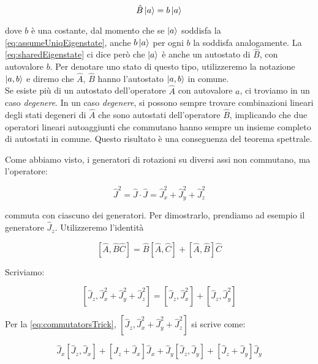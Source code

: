 	\begin{equation} \label{eq:sharedEigenstate}
		\hat{B}\ket{a} = b \ket{a}
	\end{equation}

dove $b$ \`e una costante, dal momento che se $\ket{a}$ soddisfa la \eqref{eq:assumeUniqEigenstate}, anche $b \ket{a}$ per ogni $b$ la soddisfa analogamente. La \eqref{eq:sharedEigenstate} ci dice per\`o che $\ket{a}$ \`e anche un autostato di $\hat{B}$, con autovalore $b$. Per denotare uno stato di questo tipo, utilizzeremo la notazione $\ket{a, b}$ e diremo che $\hat{A}$, $\hat{B}$ hanno l'autostato $\ket{a, b}$ in comune. \\

Se esiste pi\`u di un autostato dell'operatore $\hat{A}$ con autovalore $a$, ci troviamo in un caso \textit{degenere}. In un caso \textit{degenere}, si possono sempre trovare combinazioni lineari degli stati degeneri di $\hat{A}$ che sono autostati dell'operatore $\hat{B}$, implicando che due operatori lineari autoaggiunti che commutano hanno sempre un insieme completo di autostati in comune. Questo risultato \`e una conseguenza del teorema spettrale.

Come abbiamo visto, i generatori di rotazioni su diversi assi non commutano, ma l'operatore:

	\begin{equation}
		\hat{J}^2 = \hat{J} \cdot \hat{J} = \hat{J}_x^2 + \hat{J}_y^2 + \hat{J}_z^2
	\end{equation}

commuta con ciascuno dei generatori. Per dimostrarlo, prendiamo ad esempio il generatore $\hat{J}_z$. Utilizzeremo l'identit\`a

	\begin{equation} \label{eq:commutatorsTrick}
		\left [ \hat{A}, \hat{B}\hat{C} \right ] = \hat{B} \left [ \hat{A}, \hat{C} \right ] + \left [ \hat{A}, \hat{B} \right ] \hat{C}
	\end{equation}

Scriviamo:

	\begin{equation}
		\left [ \hat{J}_z, \hat{J}_x^2 + \hat{J}_y^2 + \hat{J}_z^2 \right ] = \left [ \hat{J}_z, \hat{J}_x^2 \right ] + \left [ \hat{J}_z, \hat{J}_y^2 \right ]
	\end{equation}

Per la \eqref{eq:commutatorsTrick}, $\left [ \hat{J}_z, \hat{J}_x^2 + \hat{J}_y^2 + \hat{J}_z^2 \right ]$ si scrive come:

	\begin{equation}
	 \hat{J}_x \left [ \hat{J}_z, \hat{J}_x \right ] + \left [ \hat{J}_z + \hat{J}_x \right ] \hat{J}_x + \hat{J}_y \left [ \hat{J}_z, \hat{J}_y \right ] + \left [ \hat{J}_z + \hat{J}_y \right ] \hat{J}_y 
	\end{equation}

